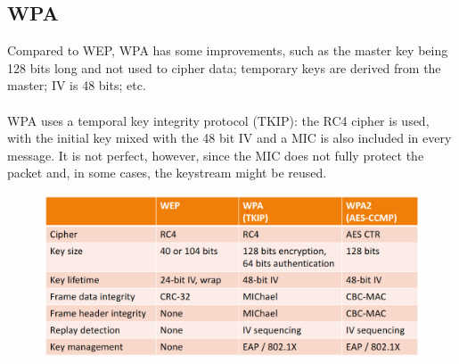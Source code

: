\documentclass[10pt,a4paper]{report}
\begin{document}
\subsection{WPA}
Compared to WEP, WPA has some improvements, such as the master key being 128 bits long and not used to cipher data; temporary keys are derived from the master; IV is 48 bits; etc.\\
\\
WPA uses a temporal key integrity protocol (TKIP): the RC4 cipher is used, with the initial key mixed with the 48 bit IV and a MIC is also included in every message. It is not perfect, however, since the MIC does not fully protect the packet and, in some cases, the keystream might be reused.
\begin{figure}[H]
\centering
\includegraphics[scale=0.4]{36.png}
\end{figure}
\end{document}
